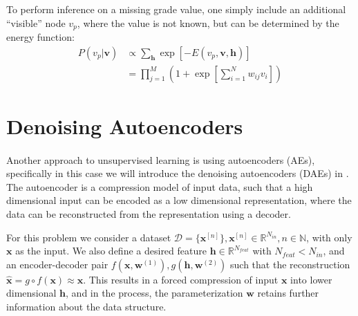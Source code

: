 To perform inference on a missing grade value,
one simply include an additional ``visible'' node $v_p$,
where the value is not known, 
but can be determined by the energy function:
%
\begin{equation*}
\begin{aligned}
    P(v_p|\mathbf{v}) &\propto
        \displaystyle\sum_{\mathbf{h}} 
        \exp[-E(v_p,\mathbf{v},\mathbf{h})] \\
    &= \prod_{j=1}^M \left( 1 + 
        \exp\left[\sum_{i=1}^N w_{ij} v_i\right]
        \right)
\end{aligned}
\end{equation*}












\section{Denoising Autoencoders} \label{sc:dae}

\paragraph{}
Another approach to unsupervised learning is using autoencoders (AEs), 
specifically in this case we will introduce the 
denoising autoencoders (DAEs) in \cite{VLLBM10}.
The autoencoder is a compression model of input data, 
such that a high dimensional input can be encoded as 
a low dimensional representation,
where the data can be reconstructed from the representation 
using a decoder.

For this problem we consider a dataset 
$\mathcal{D} = \{\mathbf{x}^{[n]}\}, 
\mathbf{x}^{[n]} \in \mathbb{R}^{N_{in}},
n \in \mathbb{N}$,
with only $\mathbf{x}$ as the input.
We also define a desired feature $\mathbf{h} \in \mathbb{R}^{N_{feat}} $
with $N_{feat} < N_{in}$,
and an encoder-decoder pair 
$f(\mathbf{x},\mathbf{w}^{(1)}), g(\mathbf{h},\mathbf{w}^{(2)})$
such that the reconstruction 
$\hat{\mathbf{x}} = g \circ f(\mathbf{x}) \approx \mathbf{x}$.
This results in a forced compression of input $\mathbf{x}$ 
into lower dimensional $\mathbf{h}$,
and in the process, the parameterization $\mathbf{w}$ retains 
further information about the data structure.

